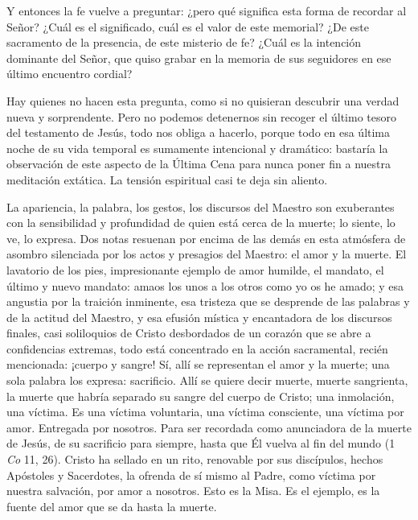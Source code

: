 			\begin{body}Y entonces la fe vuelve a preguntar: ¿pero qué significa esta forma de recordar al Señor? ¿Cuál es el significado, cuál es el valor de este memorial? ¿De este sacramento de la presencia, de este misterio de fe? ¿Cuál es la intención dominante del Señor, que quiso grabar en la memoria de sus seguidores en ese último encuentro cordial? \end{body}
			
			\begin{body}Hay quienes no hacen esta pregunta, como si no quisieran descubrir una verdad nueva y sorprendente. Pero no podemos detenernos sin recoger el último tesoro del testamento de Jesús, todo nos obliga a hacerlo, porque todo en esa última noche de su vida temporal es sumamente intencional y dramático: bastaría la observación de este aspecto de la Última Cena para nunca poner fin a nuestra meditación extática. La tensión espiritual casi te deja sin aliento. \end{body}
			
			\begin{body}La apariencia, la palabra, los gestos, los discursos del Maestro son exuberantes con la sensibilidad y profundidad de quien está cerca de la muerte; lo siente, lo ve, lo expresa. Dos notas resuenan por encima de las demás en esta atmósfera de asombro silenciada por los actos y presagios del Maestro: el amor y la muerte. El lavatorio de los pies, impresionante ejemplo de amor humilde, el mandato, el último y nuevo mandato: amaos los unos a los otros como yo os he amado; y esa angustia por la traición inminente, esa tristeza que se desprende de las palabras y de la actitud del Maestro, y esa efusión mística y encantadora de los discursos finales, casi soliloquios de Cristo desbordados de un corazón que se abre a confidencias extremas, todo está concentrado en la acción sacramental, recién mencionada: ¡cuerpo y sangre! Sí, allí se representan el amor y la muerte; una sola palabra los expresa: sacrificio. Allí se quiere decir muerte, muerte sangrienta, la muerte que habría separado su sangre del cuerpo de Cristo; una inmolación, una víctima. Es una víctima voluntaria, una víctima consciente, una víctima por amor. Entregada por nosotros. Para ser recordada como anunciadora de la muerte de Jesús, de su sacrificio para siempre, hasta que Él vuelva al fin del mundo (1 \textit{Co }11, 26). Cristo ha sellado en un rito, renovable por sus discípulos, hechos Apóstoles y Sacerdotes, la ofrenda de sí mismo al Padre, como víctima por nuestra salvación, por amor a nosotros. Esto es la Misa. Es el ejemplo, es la fuente del amor que se da hasta la muerte. \end{body}
			
